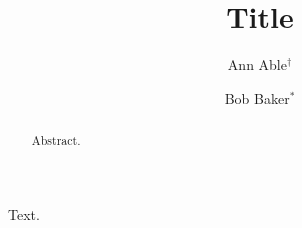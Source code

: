 \documentclass{revtex4-2}
\begin{document}
\title{Title}
\author{Ann Able$^\dagger$}
\author{Bob Baker$^\ast$}
\begin{abstract}Abstract.\end{abstract}
\maketitle
Text.
\end{document}

